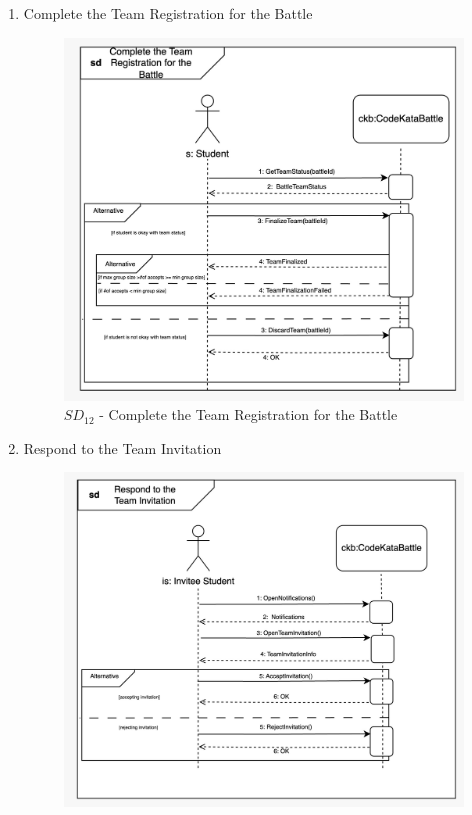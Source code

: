 \begin{enumerate}
\begin{figure}[H]
    \end{figure}
    \newpage
    \item Complete the Team Registration for the Battle
    \begin{figure}[H]
        \centering
        \includegraphics[scale=0.2]{Images/sequence_diagrams/SD-complete_team_registration_for_battle.jpeg}
        \caption{$SD_{12}$ - Complete the Team Registration for the Battle}
    \end{figure}
    \newpage
    \item Respond to the Team Invitation
    \begin{figure}[H]
        \centering
        \includegraphics[scale=0.2]{Images/sequence_diagrams/SD-respond_to_team_invitation.jpeg}

\end{figure}
\end{enumerate}

